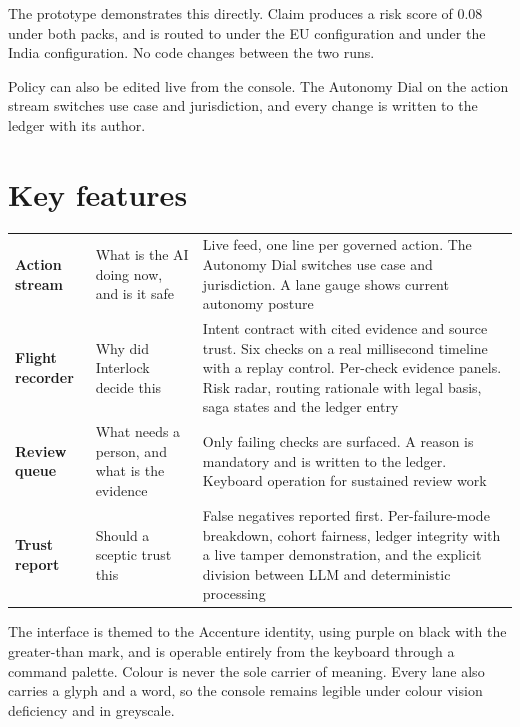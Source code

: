 \documentclass[10pt]{article}
\begin{document}
The prototype demonstrates this directly. Claim  produces a risk score of
0.08 under both packs, and is routed to  under the EU configuration and
 under the India configuration. No code changes between the two runs.

Policy can also be edited live from the console. The Autonomy Dial on the action stream
switches use case and jurisdiction, and every change is written to the ledger with its
author.

\section{Key features}

\vspace{2pt}
{\small
\begin{xltabular}{\textwidth}{@{}L{0.185\textwidth}L{0.245\textwidth}Y@{}}
\toprule
{} &  &  \\
\midrule
\textbf{Action stream} & What is the AI doing now, and is it safe & Live feed, one line per governed action. The Autonomy Dial switches use case and jurisdiction. A lane gauge shows current autonomy posture \\
\textbf{Flight recorder} & Why did Interlock decide this & Intent contract with cited evidence and source trust. Six checks on a real millisecond timeline with a replay control. Per-check evidence panels. Risk radar, routing rationale with legal basis, saga states and the ledger entry \\
\textbf{Review queue} & What needs a person, and what is the evidence & Only failing checks are surfaced. A reason is mandatory and is written to the ledger. Keyboard operation for sustained review work \\
\textbf{Trust report} & Should a sceptic trust this & False negatives reported first. Per-failure-mode breakdown, cohort fairness, ledger integrity with a live tamper demonstration, and the explicit division between LLM and deterministic processing \\
\bottomrule
\end{xltabular}}

The interface is themed to the Accenture identity, using purple on black with the
greater-than mark, and is operable entirely from the keyboard through a command palette.
Colour is never the sole carrier of meaning. Every lane also carries a glyph and a word,
so the console remains legible under colour vision deficiency and in greyscale.
\end{document}
